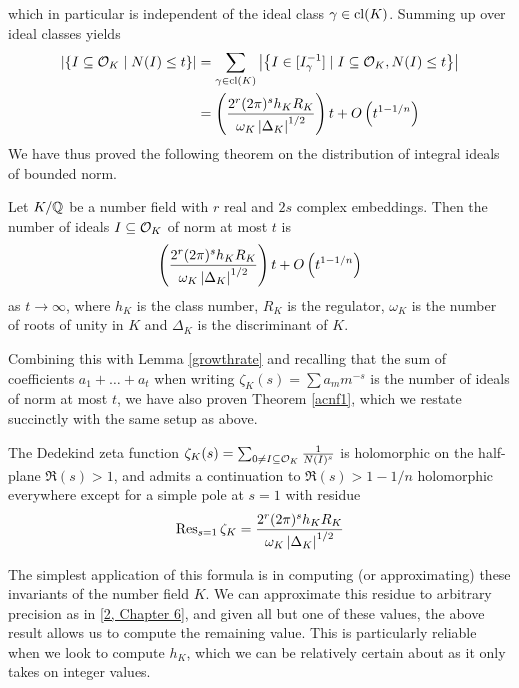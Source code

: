 \documentclass[11pt]{report}
\begin{document}
which in particular is independent of the ideal class $\gamma \in \operatorname{cl}(K)$. Summing up over ideal classes yields
\begin{align*}
    \left| \left\{  I \subseteq \mathcal{O}_K \mid N(I) \leq t  \right\} \right| &= \sum_{\gamma \in \operatorname{cl}(K)}\left| \left\{  I \in [I_{\gamma}^{-1}] \mid I \subseteq \mathcal{O}_K, N(I) \leq t  \right\} \right| \\ 
    &= \left(  \frac{2^r(2\pi)^s h_KR_K}{\omega_K \left| \Delta_K \right|^{1/2}}  \right)t + O\left(  t^{1 - 1/n}  \right)
\end{align*}
We have thus proved the following theorem on the distribution of integral ideals of bounded norm.
\begin{theorem}[]
    Let $K / \mathbb{Q}$ be a number field with $r$ real and $2s$ complex embeddings. Then the number of ideals $I \subseteq \mathcal{O}_K$ of norm at most $t$ is
    $$
        \left(  \frac{2^r(2\pi)^s h_KR_K}{\omega_K\left| \Delta_K \right|^{1/2}}  \right)t + O\left(  t^{1 - 1/n}  \right)
    $$
    as $t \to \infty$, where $h_K$ is the class number, $R_K$ is the regulator, $\omega_K$ is the number of roots of unity in $K$ and $\Delta_K$ is the discriminant of $K$.
\end{theorem}
Combining this with Lemma \ref{growthrate} and recalling that the sum of coefficients $a_1 + \ldots + a_t$ when writing $\zeta_K(s) = \sum a_mm^{-s}$ is the number of ideals of norm at most $t$, we have also proven Theorem \ref{acnf1}, which we restate succinctly with the same setup as above.
\begin{theorem}
    The Dedekind zeta function $\zeta_K(s) = \sum_{0 \neq I \subseteq \mathcal{O}_K} \frac{1}{N(I)^s}$ is holomorphic on the half-plane $\Re(s) > 1$, and admits a continuation to $\Re(s) > 1 - 1/n$ holomorphic everywhere except for a simple pole at $s = 1$ with residue
    $$
        \operatorname{Res}_{s = 1}\zeta_K = \frac{2^r(2\pi)^sh_KR_K}{\omega_K\left| \Delta_K \right|^{1/2}}
    $$
\end{theorem}
The simplest application of this formula is in computing (or approximating) these invariants of the number field $K$. We can approximate this residue to arbitrary precision as in \hyperlink{stevenhagen}{[2, Chapter 6]}, and given all but one of these values, the above result allows us to compute the remaining value. This is particularly reliable when we look to compute $h_K$, which we can be relatively certain about as it only takes on integer values.
\end{document}
